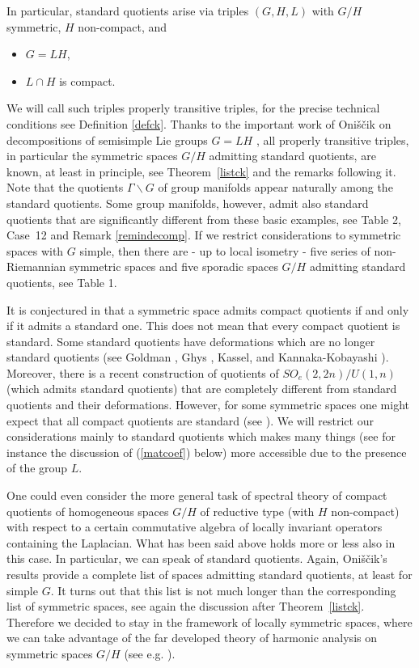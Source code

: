 \documentclass[10]{amsart}
\theoremstyle{remark}
\theoremstyle{definition}
\numberwithin{equation}{section}
\begin{document}
In particular, standard quotients arise via triples $(G,H,L)$ with $G/H$ symmetric, $H$ non-compact, and  
%
\begin{itemize}
\item[(i)] $G=LH$,
\item[(ii)] $L\cap H$ is compact.
\end{itemize}
%
We will call such triples properly transitive triples, for the precise technical conditions see Definition \ref{defck}. Thanks to the important work of  Oni\v s\v cik
on decompositions of semisimple Lie groups $G=LH$ \cite{Oni62}\cite{Oni69}, all properly transitive triples, in particular the symmetric spaces $G/H$ admitting standard quotients, are known, at least in principle, see 
Theorem~\ref{listck} and the remarks following it.  Note that the quotients $\Gamma\backslash G$ of group manifolds appear naturally among the standard quotients.
Some group manifolds, however, admit also standard quotients that are significantly different from these basic examples, see Table 2, Case~12 and Remark \ref{remindecomp}. If we restrict considerations to symmetric spaces with $G$ simple, then there are - up to local isometry - five series of non-Riemannian symmetric spaces and five sporadic spaces $G/H$
admitting standard quotients, see Table 1.   

It is conjectured in \cite{KY05} that a symmetric space admits compact quotients if and only if it admits a standard one. This does not mean that every compact quotient is standard. Some
standard quotients have deformations which are no longer standard quotients (see Goldman \cite{Gol85}, Ghys \cite{Ghy87}, Kassel\cite{Ka12}, and Kannaka-Kobayashi \cite{KaK25}). Moreover, there
is a recent construction \cite{MST23} of quotients of $SO_e(2,2n)/U(1,n)$ (which admits standard quotients) that are completely different from standard quotients and their deformations. However, for some symmetric spaces one might expect that all compact quotients are standard (see \cite{Ze98}). We will restrict our considerations mainly to standard quotients which makes many things (see for instance the discussion of (\ref{matcoef}) below) more accessible due to the presence of the group $L$.

One could even consider the more general task of spectral theory of compact quotients of homogeneous spaces $G/H$ of reductive type (with $H$ non-compact) with respect to a certain commutative algebra of locally invariant operators containing the Laplacian. What has been said above holds more
or less also in this case. In particular, we can speak of standard quotients. Again, Oni\v s\v cik's results provide a complete list of spaces admitting standard quotients, at least for 
simple $G$. It turns out that this list is not much longer than the corresponding list of symmetric spaces, see again the discussion after  Theorem~\ref{listck}. Therefore we decided to stay
in the framework of locally symmetric spaces, where we can take advantage of the far developed theory of harmonic analysis on symmetric spaces $G/H$ (see e.g. \cite{vdBFJS}).
\end{document}

